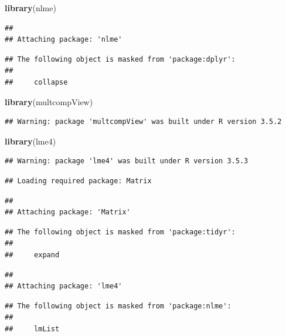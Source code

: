 \documentclass[]{article}
\newenvironment{Shaded}{\begin{snugshade}}{\end{snugshade}}
\newcommand{\KeywordTok}[1]{\textcolor[rgb]{0.13,0.29,0.53}{\textbf{#1}}}
\newcommand{\NormalTok}[1]{#1}
\begin{document}
\begin{Shaded}
\begin{Highlighting}[]
\KeywordTok{library}\NormalTok{(nlme)}
\end{Highlighting}
\end{Shaded}

\begin{verbatim}
## 
## Attaching package: 'nlme'
\end{verbatim}

\begin{verbatim}
## The following object is masked from 'package:dplyr':
## 
##     collapse
\end{verbatim}

\begin{Shaded}
\begin{Highlighting}[]
\KeywordTok{library}\NormalTok{(multcompView)}
\end{Highlighting}
\end{Shaded}

\begin{verbatim}
## Warning: package 'multcompView' was built under R version 3.5.2
\end{verbatim}

\begin{Shaded}
\begin{Highlighting}[]
\KeywordTok{library}\NormalTok{(lme4)}
\end{Highlighting}
\end{Shaded}

\begin{verbatim}
## Warning: package 'lme4' was built under R version 3.5.3
\end{verbatim}

\begin{verbatim}
## Loading required package: Matrix
\end{verbatim}

\begin{verbatim}
## 
## Attaching package: 'Matrix'
\end{verbatim}

\begin{verbatim}
## The following object is masked from 'package:tidyr':
## 
##     expand
\end{verbatim}

\begin{verbatim}
## 
## Attaching package: 'lme4'
\end{verbatim}

\begin{verbatim}
## The following object is masked from 'package:nlme':
## 
##     lmList
\end{verbatim}
\end{document}

